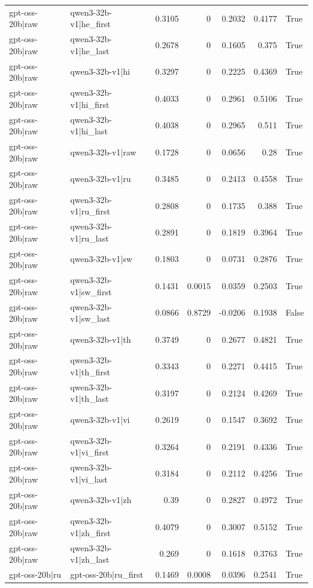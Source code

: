 \begin{table}
\begin{tabular}{l l r r r r l}
gpt-oss-20b|raw & qwen3-32b-v1|he_first & 0.3105 & 0 & 0.2032 & 0.4177 & True \\
gpt-oss-20b|raw & qwen3-32b-v1|he_last & 0.2678 & 0 & 0.1605 & 0.375 & True \\
gpt-oss-20b|raw & qwen3-32b-v1|hi & 0.3297 & 0 & 0.2225 & 0.4369 & True \\
gpt-oss-20b|raw & qwen3-32b-v1|hi_first & 0.4033 & 0 & 0.2961 & 0.5106 & True \\
gpt-oss-20b|raw & qwen3-32b-v1|hi_last & 0.4038 & 0 & 0.2965 & 0.511 & True \\
gpt-oss-20b|raw & qwen3-32b-v1|raw & 0.1728 & 0 & 0.0656 & 0.28 & True \\
gpt-oss-20b|raw & qwen3-32b-v1|ru & 0.3485 & 0 & 0.2413 & 0.4558 & True \\
gpt-oss-20b|raw & qwen3-32b-v1|ru_first & 0.2808 & 0 & 0.1735 & 0.388 & True \\
gpt-oss-20b|raw & qwen3-32b-v1|ru_last & 0.2891 & 0 & 0.1819 & 0.3964 & True \\
gpt-oss-20b|raw & qwen3-32b-v1|sw & 0.1803 & 0 & 0.0731 & 0.2876 & True \\
gpt-oss-20b|raw & qwen3-32b-v1|sw_first & 0.1431 & 0.0015 & 0.0359 & 0.2503 & True \\
gpt-oss-20b|raw & qwen3-32b-v1|sw_last & 0.0866 & 0.8729 & -0.0206 & 0.1938 & False \\
gpt-oss-20b|raw & qwen3-32b-v1|th & 0.3749 & 0 & 0.2677 & 0.4821 & True \\
gpt-oss-20b|raw & qwen3-32b-v1|th_first & 0.3343 & 0 & 0.2271 & 0.4415 & True \\
gpt-oss-20b|raw & qwen3-32b-v1|th_last & 0.3197 & 0 & 0.2124 & 0.4269 & True \\
gpt-oss-20b|raw & qwen3-32b-v1|vi & 0.2619 & 0 & 0.1547 & 0.3692 & True \\
gpt-oss-20b|raw & qwen3-32b-v1|vi_first & 0.3264 & 0 & 0.2191 & 0.4336 & True \\
gpt-oss-20b|raw & qwen3-32b-v1|vi_last & 0.3184 & 0 & 0.2112 & 0.4256 & True \\
gpt-oss-20b|raw & qwen3-32b-v1|zh & 0.39 & 0 & 0.2827 & 0.4972 & True \\
gpt-oss-20b|raw & qwen3-32b-v1|zh_first & 0.4079 & 0 & 0.3007 & 0.5152 & True \\
gpt-oss-20b|raw & qwen3-32b-v1|zh_last & 0.269 & 0 & 0.1618 & 0.3763 & True \\
gpt-oss-20b|ru & gpt-oss-20b|ru_first & 0.1469 & 0.0008 & 0.0396 & 0.2541 & True \\

\end{tabular}
\end{table}
